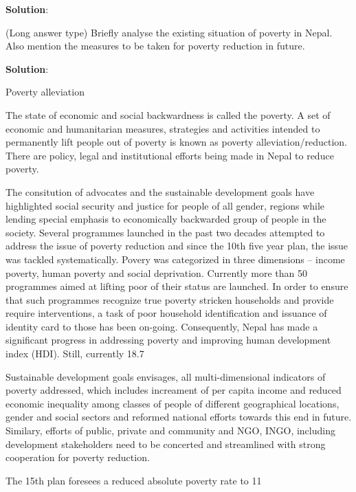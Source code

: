 \documentclass[
  openany]{book}
\newcommand{\question}{\item}
\newenvironment{solution}{ {\bfseries Solution}:}{}
\begin{document}
\begin{questions}
\begin{solution}
\end{solution}

\question (Long answer type) Briefly analyse the existing situation of poverty in Nepal. Also mention the measures to be taken for poverty reduction in future.

\begin{solution}

Poverty alleviation

The state of economic and social backwardness is called the poverty. A set of economic and humanitarian measures, strategies and activities intended to permanently lift people out of poverty is known as poverty alleviation/reduction. There are policy, legal and institutional efforts being made in Nepal to reduce poverty.

The consitution of advocates and the sustainable development goals have highlighted social security and justice for people of all gender, regions while lending special emphasis to economically backwarded group of people in the society. Several programmes launched in the past two decades attempted to address the issue of poverty reduction and since the 10th five year plan, the issue was tackled systematically. Povery was categorized in three dimensions -- income poverty, human poverty and social deprivation. Currently more than 50 programmes aimed at lifting poor of their status are launched. In order to ensure that such programmes recognize true poverty stricken households and provide require interventions, a task of poor household identification and issuance of identity card to those has been on-going. Consequently, Nepal has made a significant progress in addressing poverty and improving human development index (HDI). Still, currently 18.7%

Sustainable development goals envisages, all multi-dimensional indicators of poverty addressed, which includes increament of per capita income and reduced economic inequality among classes of people of different geographical locations, gender and social sectors and reformed national efforts towards this end in future. Similary, efforts of public, private and community and NGO, INGO, including development stakeholders need to be concerted and streamlined with strong cooperation for poverty reduction.

The 15th plan foresees a reduced absolute poverty rate to 11%


\end{solution}
\end{questions}
\end{document}
